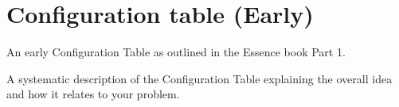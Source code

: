 \section{Configuration table (Early)}
An early Configuration Table as outlined in the Essence book Part 1.



A systematic description of the Configuration Table explaining the overall idea and how it relates to your problem.
